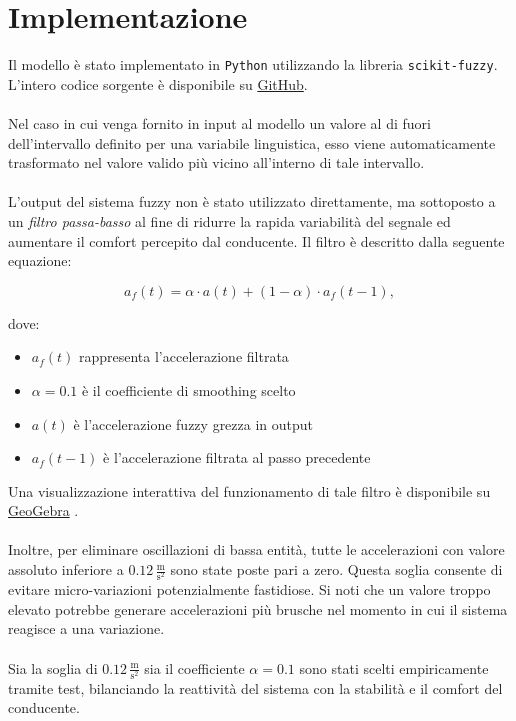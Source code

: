\chapter{Implementazione}
\label{cha:implementazione}

Il modello è stato implementato in \texttt{Python} utilizzando la libreria \texttt{scikit-fuzzy}.  
L'intero codice sorgente è disponibile su \href{https://github.com/Leso246/FuzzyACC}{GitHub}.
\\\\
\noindent Nel caso in cui venga fornito in input al modello un valore al di fuori dell'intervallo
definito per una variabile linguistica, esso viene automaticamente trasformato nel valore valido più vicino 
all'interno di tale intervallo.
\\\\
\noindent L'output del sistema fuzzy non è stato utilizzato direttamente, ma sottoposto a un \emph{filtro passa-basso} 
al fine di ridurre la rapida variabilità del segnale ed aumentare il comfort percepito dal conducente.  
Il filtro è descritto dalla seguente equazione:

\[
a_{f}(t) = \alpha \cdot a(t) + (1 - \alpha) \cdot a_{f}(t-1),
\]

\noindent dove:
\begin{itemize}
    \item $a_{f}(t)$ rappresenta l'accelerazione filtrata
    \item $\alpha = 0.1$ è il coefficiente di smoothing scelto
    \item $a(t)$ è l'accelerazione fuzzy grezza in output
    \item $a_{f}(t-1)$ è l'accelerazione filtrata al passo precedente
\end{itemize}
Una visualizzazione interattiva del funzionamento di tale filtro è disponibile 
su \href{https://www.geogebra.org/m/tb88mqrm}{GeoGebra} \cite{geogebraEWMA}.
\\\\
\noindent Inoltre, per eliminare oscillazioni di bassa entità, tutte le accelerazioni con valore assoluto inferiore a $0.12 \, \frac{\mathrm{m}}{\mathrm{s^2}}$ 
sono state poste pari a zero.  
Questa soglia consente di evitare micro-variazioni potenzialmente fastidiose. Si noti che un valore troppo elevato potrebbe
generare accelerazioni più brusche nel momento in cui il sistema reagisce a una variazione.
\\\\
\noindent Sia la soglia di $0.12 \,\frac{\mathrm{m}}{\mathrm{s^2}}$ sia il coefficiente $\alpha = 0.1$ sono stati scelti empiricamente tramite test, 
bilanciando la reattività del sistema con la stabilità e il comfort del conducente.

